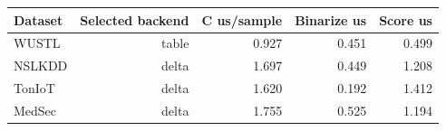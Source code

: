 \begin{tabular}{lrrrr}
\toprule
Dataset & Selected backend & C us/sample & Binarize us & Score us \\
\midrule
WUSTL & table & 0.927 & 0.451 & 0.499 \\
NSLKDD & delta & 1.697 & 0.449 & 1.208 \\
TonIoT & delta & 1.620 & 0.192 & 1.412 \\
MedSec & delta & 1.755 & 0.525 & 1.194 \\
\bottomrule
\end{tabular}
